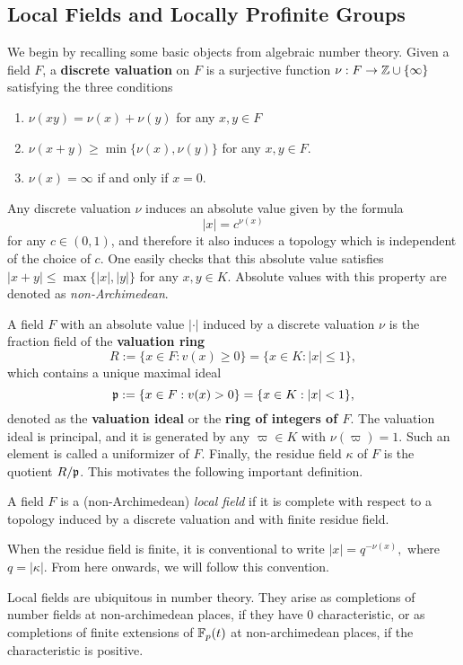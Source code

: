 \subsection{Local Fields and Locally Profinite Groups}
We begin by recalling some basic objects from algebraic number theory. Given a field $F$, a \textbf{discrete valuation} on $F$ is a surjective function $\nu: F\to\mathbb{Z}\cup\{\infty\}$ satisfying the three conditions

\begin{enumerate}
    \item $\nu(xy)=\nu(x)+\nu(y)$ for any $x,y\in F$ 
    \item $\nu(x+y)\geq\min\{\nu(x),\nu(y)\}$ for any $x,y\in F$.
    \item $\nu(x)=\infty$ if and only if $x=0$.
\end{enumerate}

Any discrete valuation $\nu$ induces an absolute value given by the formula 
$$|x|=c^{\nu(x)}$$ 
for any $c\in(0,1)$, and therefore it also induces a topology which is independent of the choice of $c$. One easily checks that this absolute value satisfies $|x+y|\leq\max\{|x|,|y|\}$ for any $x,y\in K$. Absolute values with this property are denoted as \textit{non-Archimedean}. 

A field $F$ with an absolute value $|\cdot|$ induced by a discrete valuation $\nu$ is the fraction field of the \textbf{valuation ring}
$$R:=\{x\in F:v(x)\geq 0\}=\{x\in K: |x|\leq1\},$$ 
which contains a unique maximal ideal
$$\mathfrak{p}:=\{x\in F:v(x)> 0\}=\{x\in K: |x|<1\},$$
denoted as the \textbf{valuation ideal} or the \textbf{ring of integers of $F$}. The valuation ideal is principal, and it is generated by any $\varpi\in K$ with $\nu(\varpi)=1$. Such an element is called a uniformizer of $F$. Finally, the residue field $\kappa$ of $F$ is the quotient $R/\mathfrak{p}$. This motivates the following important definition.

\begin{defn}
    A field $F$ is a (non-Archimedean) \textit{local field} if it is complete with respect to a topology induced by a discrete valuation and with finite residue field.
\end{defn}

\begin{rem}
    When the residue field is finite, it is conventional to write 
    $|x|=q^{-\nu(x)},$
    where $q=|\kappa|$. From here onwards, we will follow this convention.
\end{rem}
\begin{rem}
    Local fields are ubiquitous in number theory. They arise as completions of number fields at non-archimedean places, if they have $0$ characteristic, or as completions of finite extensions of $\mathbb{F}_p(t)$ at non-archimedean places, if the characteristic is positive.
\end{rem}


